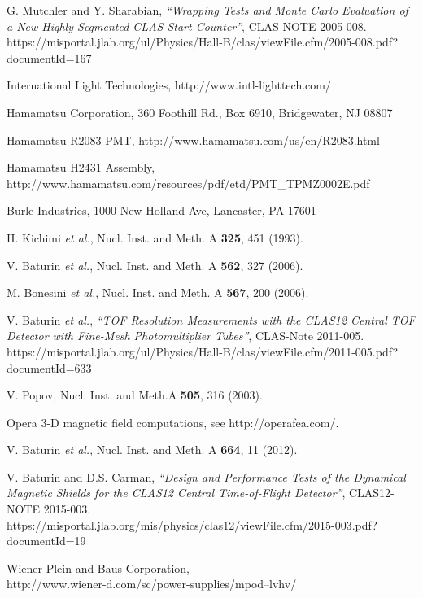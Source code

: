 \documentclass{elsart}
\begin{document}
\begin{thebibliography}{99}
G. Mutchler and Y. Sharabian, {\it ``Wrapping Tests and Monte Carlo Evaluation of a New Highly 
Segmented CLAS Start Counter''}, CLAS-NOTE 2005-008.\\
https://misportal.jlab.org/ul/Physics/Hall-B/clas/viewFile.cfm/2005-008.pdf?documentId=167

International Light Technologies, http://www.intl-lighttech.com/

Hamamatsu Corporation, 360 Foothill Rd., Box 6910, Bridgewater, NJ 08807

Hamamatsu R2083 PMT, http://www.hamamatsu.com/us/en/R2083.html

Hamamatsu H2431 Assembly, \\
http://www.hamamatsu.com/resources/pdf/etd/PMT\_TPMZ0002E.pdf

Burle Industries, 1000 New Holland Ave, Lancaster, PA 17601

H. Kichimi {\it et al.}, Nucl. Inst. and Meth. A {\bf 325}, 451 (1993).

V. Baturin {\it et al.}, Nucl. Inst. and Meth. A {\bf 562}, 327 (2006).

M. Bonesini {\it et al.}, Nucl. Inst. and Meth. A {\bf 567}, 200 (2006).

V. Baturin {\it et al.}, {\it ``TOF Resolution Measurements with the CLAS12 Central TOF 
Detector with Fine-Mesh Photomultiplier Tubes''}, CLAS-Note 2011-005.\\
https://misportal.jlab.org/ul/Physics/Hall-B/clas/viewFile.cfm/2011-005.pdf?documentId=633

V. Popov, Nucl. Inst. and Meth.A {\bf 505}, 316 (2003).

Opera 3-D magnetic field computations, see http://operafea.com/.

V. Baturin {\it et al.}, Nucl. Inst. and Meth. A {\bf 664}, 11 (2012).

V. Baturin and D.S. Carman, {\it ``Design and Performance Tests of the Dynamical Magnetic Shields 
for the CLAS12 Central Time-of-Flight Detector''}, CLAS12-NOTE 2015-003.\\
https://misportal.jlab.org/mis/physics/clas12/viewFile.cfm/2015-003.pdf?documentId=19

Wiener Plein and Baus Corporation,\\
http://www.wiener-d.com/sc/power-supplies/mpod--lvhv/


\end{thebibliography}
\end{document}
